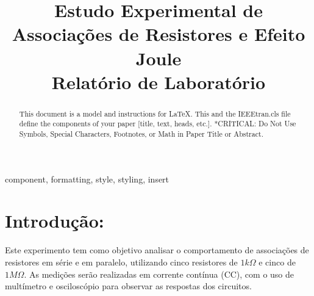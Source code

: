 \documentclass[conference]{IEEEtran}
\begin{document}
\title{Estudo Experimental de Associações de Resistores e Efeito Joule\\
{\footnotesize Relatório de Laboratório}
}
\author{
    \and
    \and
}

\maketitle

\begin{abstract}
    This document is a model and instructions for \LaTeX.
    This and the IEEEtran.cls file define the components of your paper [title, text, heads, etc.]. *CRITICAL: Do Not Use Symbols, Special Characters, Footnotes,
    or Math in Paper Title or Abstract.
\end{abstract}

\begin{IEEEkeywords}
    component, formatting, style, styling, insert
\end{IEEEkeywords}

\section{Introdução:}

Este experimento tem como objetivo analisar o comportamento de associações de resistores em série e em paralelo, utilizando cinco resistores de $1 k\Omega$ e cinco de $1 M\Omega$. As medições serão realizadas em corrente contínua (CC), com o uso de multímetro e osciloscópio para observar as respostas dos circuitos.
\end{document}
